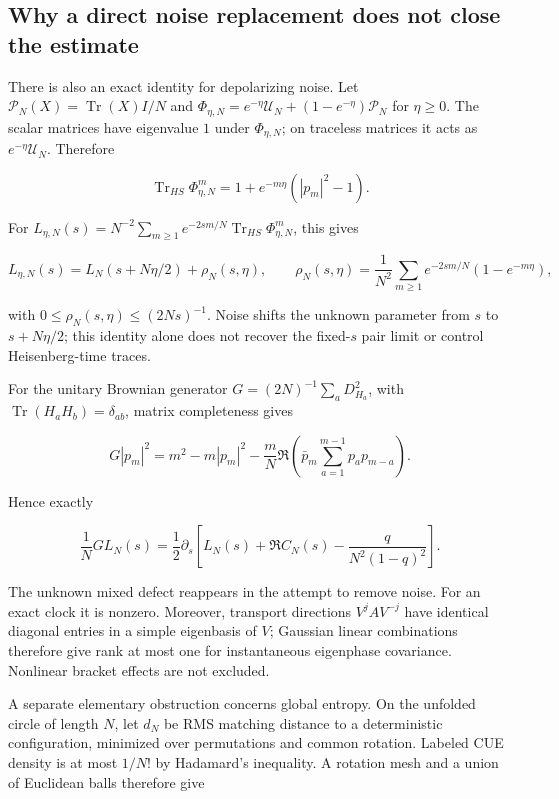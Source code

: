 \hypertarget{why-a-direct-noise-replacement-does-not-close-the-estimate}{%
\subsection{Why a direct noise replacement does not close the estimate}\label{why-a-direct-noise-replacement-does-not-close-the-estimate}}

There is also an exact identity for depolarizing noise. Let
\(\mathcal P_N(X)=\operatorname{Tr}(X)I/N\) and
\(\Phi_{\eta,N}=e^{-\eta}\mathcal U_N+(1-e^{-\eta})\mathcal P_N\) for
\(\eta\ge0\). The scalar matrices have eigenvalue \(1\) under \(\Phi_{\eta,N}\);
on traceless matrices it acts as \(e^{-\eta}\mathcal U_N\). Therefore

\[
\operatorname{Tr}_{HS}\Phi_{\eta,N}^m
=1+e^{-m\eta}(|p_m|^2-1).
\]

For
\(L_{\eta,N}(s)=N^{-2}\sum_{m\ge1}e^{-2sm/N}\operatorname{Tr}_{HS}\Phi_{\eta,N}^m\),
this gives

\[
L_{\eta,N}(s)=L_N(s+N\eta/2)+\rho_N(s,\eta),\qquad
\rho_N(s,\eta)=\frac1{N^2}\sum_{m\ge1}e^{-2sm/N}(1-e^{-m\eta}),
\]

with \(0\le\rho_N(s,\eta)\le(2Ns)^{-1}\). Noise shifts the unknown
parameter from \(s\) to \(s+N\eta/2\); this identity alone does not recover the
fixed-\(s\) pair limit or control Heisenberg-time traces.

For the unitary Brownian generator \(G=(2N)^{-1}\sum_a D_{H_a}^2\), with
\(\operatorname{Tr}(H_aH_b)=\delta_{ab}\), matrix completeness gives

\[
G|p_m|^2=m^2-m|p_m|^2-
 \frac mN\Re\left(\bar p_m\sum_{a=1}^{m-1}p_a p_{m-a}\right).
\]

Hence exactly

\[
\frac1N GL_N(s)=\frac12\partial_s
 \left[L_N(s)+\Re C_N(s)-\frac{q}{N^2(1-q)^2}\right].
\]

The unknown mixed defect reappears in the attempt to remove noise. For an
exact clock it is nonzero. Moreover, transport directions \(V^jAV^{-j}\)
have identical diagonal entries in a simple eigenbasis of \(V\); Gaussian
linear combinations therefore give rank at most one for instantaneous
eigenphase covariance. Nonlinear bracket effects are not excluded.

A separate elementary obstruction concerns global entropy. On the unfolded
circle of length \(N\), let \(d_N\) be RMS matching distance to a deterministic
configuration, minimized over permutations and common rotation. Labeled
CUE density is at most \(1/N!\) by Hadamard's inequality. A rotation mesh
and a union of Euclidean balls therefore give

